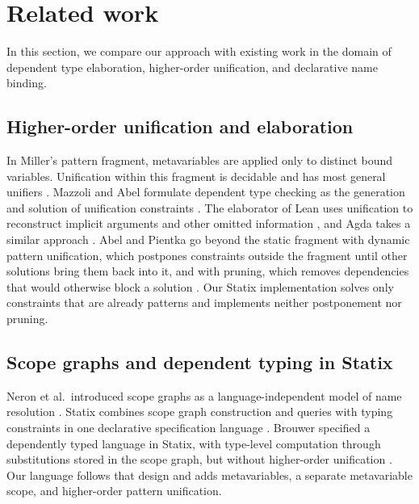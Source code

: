 
\section{\label{sec:related-work}Related work}

In this section, we compare our approach with existing work in the domain of dependent type elaboration, higher-order unification, and declarative name binding.

\subsection{Higher-order unification and elaboration}
In Miller's pattern fragment, metavariables are applied only to distinct bound
variables. Unification within this fragment is decidable and has most general
unifiers \autocite{miller_logic_1991}. Mazzoli
and Abel formulate dependent type checking as the generation and solution of
unification constraints \autocite{mazzoli2016typechecking}. The elaborator of
Lean uses unification to reconstruct implicit arguments and other omitted
information \autocite{demoura2015elaboration}, and Agda takes a similar approach
\autocite{norell2007practical}. Abel and Pientka go beyond the static fragment
with dynamic pattern unification, which postpones constraints outside the
fragment until other solutions bring them back into it, and with pruning,
which removes dependencies that would otherwise block a solution
\autocite{abel_extensions_2018}. Our Statix implementation solves only
constraints that are already patterns and implements neither postponement nor
pruning.

\subsection{Scope graphs and dependent typing in Statix}
Neron et al.\ introduced scope graphs as a language-independent model of name
resolution \autocite{neron_extensible_2015}. Statix combines scope graph
construction and queries with typing constraints in one declarative
specification language \autocite{van_antwerpen_scopes_2018,
4bf44aa1779c4a968c555e1b54e16119}. Brouwer specified a dependently typed
language in Statix, with type-level computation through substitutions stored in
the scope graph, but without higher-order unification
\autocite{none_dependently_2023}. Our language follows that design and adds
metavariables, a separate metavariable scope, and higher-order pattern
unification.

